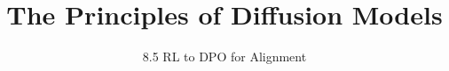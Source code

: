 
\title{The Principles of Diffusion Models}
\subtitle{8.5 RL to DPO for Alignment}


\begin{frame}
    \titlepage
\end{frame}


